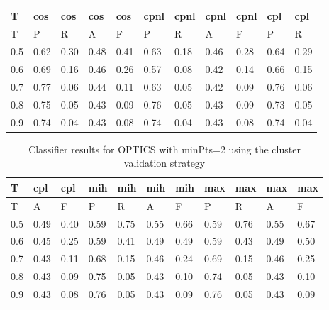 \begin{center}
\begin{table}[!h]
\centering
\begin{tabular}{|l|l|l|l|l|l|l|l|l|l|l|}
  \hline
T & cos & cos & cos & cos & cpnl & cpnl & cpnl & cpnl & cpl & cpl \\ 
  \hline
T & P & R & A & F & P & R & A & F & P & R \\ 
   \hline
0.5 & 0.62 & 0.30 & 0.48 & 0.41 & 0.63 & 0.18 & 0.46 & 0.28 & 0.64 & 0.29 \\ 
  0.6 & 0.69 & 0.16 & 0.46 & 0.26 & 0.57 & 0.08 & 0.42 & 0.14 & 0.66 & 0.15 \\ 
  0.7 & 0.77 & 0.06 & 0.44 & 0.11 & 0.63 & 0.05 & 0.42 & 0.09 & 0.76 & 0.06 \\ 
  0.8 & 0.75 & 0.05 & 0.43 & 0.09 & 0.76 & 0.05 & 0.43 & 0.09 & 0.73 & 0.05 \\ 
  0.9 & 0.74 & 0.04 & 0.43 & 0.08 & 0.74 & 0.04 & 0.43 & 0.08 & 0.74 & 0.04 \\ 
   \hline
\end{tabular}
\end{table}
\begin{table}[!h]
\centering
\begin{tabular}{|l|l|l|l|l|l|l|l|l|l|l|}
  \hline
T & cpl & cpl & mih & mih & mih & mih & max & max & max & max \\ 
  \hline
T & A & F & P & R & A & F & P & R & A & F \\ 
   \hline
0.5 & 0.49 & 0.40 & 0.59 & 0.75 & 0.55 & 0.66 & 0.59 & 0.76 & 0.55 & 0.67 \\ 
  0.6 & 0.45 & 0.25 & 0.59 & 0.41 & 0.49 & 0.49 & 0.59 & 0.43 & 0.49 & 0.50 \\ 
  0.7 & 0.43 & 0.11 & 0.68 & 0.15 & 0.46 & 0.24 & 0.69 & 0.15 & 0.46 & 0.25 \\ 
  0.8 & 0.43 & 0.09 & 0.75 & 0.05 & 0.43 & 0.10 & 0.74 & 0.05 & 0.43 & 0.10 \\ 
  0.9 & 0.43 & 0.08 & 0.76 & 0.05 & 0.43 & 0.09 & 0.76 & 0.05 & 0.43 & 0.09 \\ 
   \hline
\end{tabular}
\caption{Classifier results for OPTICS with minPts=2 using the cluster validation strategy} 
\label{tab:optics-minpts-2-cluster}
\end{table}\end{center}
